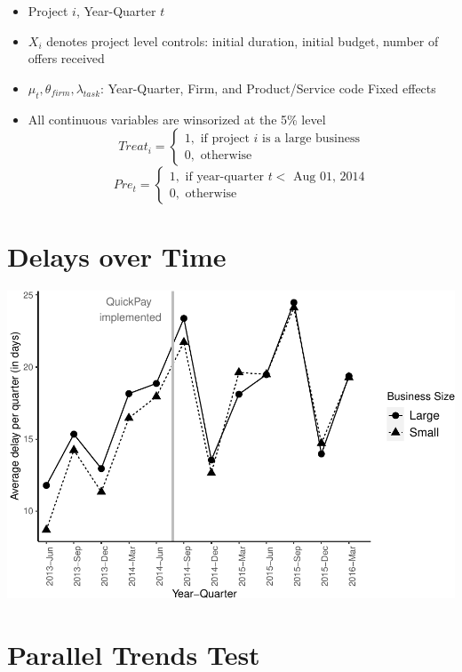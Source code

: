 \documentclass[
]{article}
\providecommand{\tightlist}{%
  \setlength{\itemsep}{0pt}\setlength{\parskip}{0pt}}
\begin{document}
\begin{itemize}
\tightlist
\item
  Project \(i\), Year-Quarter \(t\)
\item
  \(X_i\) denotes project level controls: initial duration, initial
  budget, number of offers received
\item
  \(\mu_t,\theta_{firm},\lambda_{task}\): Year-Quarter, Firm, and
  Product/Service code Fixed effects
\item
  All continuous variables are winsorized at the 5\% level
  \[ Treat_i = \begin{cases} 1, \text{ if project } i \text{ is a large business}\\
  0, \text{ otherwise} \end{cases}\]
  \[ Pre_t = \begin{cases} 1, \text{ if year-quarter } t < \text{ Aug 01, 2014}\\
  0, \text{ otherwise} \end{cases}\]
\end{itemize}

\hypertarget{delays-over-time}{%
\section{Delays over Time}\label{delays-over-time}}

\includegraphics{qp_second_implementation_files/figure-latex/plot-1.pdf}

\hypertarget{parallel-trends-test}{%
\section{Parallel Trends Test}\label{parallel-trends-test}}
\end{document}
